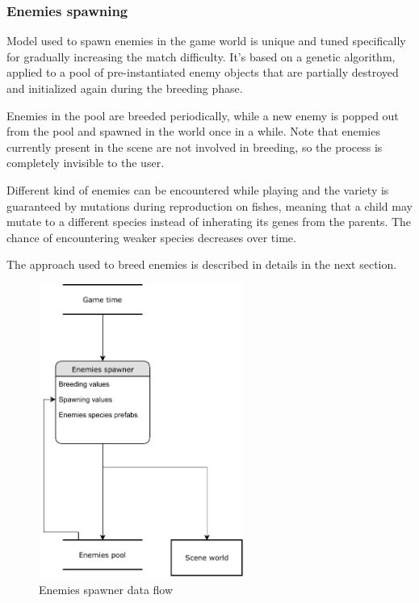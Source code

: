 \documentclass[11pt]{article}
\begin{document}
\subsubsection{Enemies spawning}
Model used to spawn enemies in the game world is unique and tuned specifically for gradually increasing the match difficulty.
It's based on a genetic algorithm, applied to a pool of pre-instantiated enemy objects that are partially destroyed and initialized again during the breeding phase.

Enemies in the pool are breeded periodically, while a new enemy is popped out from the pool and spawned in the world once in a while. Note that enemies currently present in the scene are not involved in breeding, so the process is completely invisible to the user.

Different kind of enemies can be encountered while playing and the variety is guaranteed by mutations during reproduction on fishes, meaning that a child may mutate to a different species instead of inherating its genes from the parents. The chance of encountering weaker species decreases over time.

The approach used to breed enemies is described in details in the next section.

\begin{figure}[H]
  \centering
  \includegraphics[width=0.6\textwidth]{figures/enemies_spawner}
  \caption{Enemies spawner data flow}
\end{figure}
\end{document}
